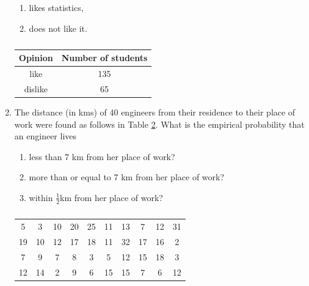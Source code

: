 \begin{enumerate}[label=\arabic*.,ref=\thesubsection.\theenumi]
\begin{enumerate}
\item likes statistics,
\item  does not like it.
\end{enumerate}
\begin{table}[!ht]
\centering
\begin{tabular}{ |c|c| } 
 \hline
 \textbf{Opinion} &\textbf{Number of students}\\
 \hline
 like  &135\\ 
 \hline
 dislike  &65\\ 
 \hline
\end{tabular}
\caption{}
\label{table:1.2.6}
\end{table}
\solution


\item The distance (in kms) of 40 engineers from their residence to their place of work were found as follows in Table \ref{table:1.2.7}.
What is the empirical probability that an engineer lives
\begin{enumerate}
\item less than 7 km from her place of work?
\item more than or equal to 7 km from her place of work? 
\item within $\frac{1}{2}$km from her place of work?
\end{enumerate}

\begin{table}[!ht]
\centering
\begin{tabular}{ cccccccccc} 

 5 &3 &10 &20 &25 &11 &13 &7 &12 &31\\
 19 &10 &12 &17 &18 &11 &32 &17 &16 &2\\
 7 &9 &7 &8 &3 &5 &12 &15 &18 &3 \\
 12 &14 &2 &9 &6 &15 &15 &7 &6 &12\\ 
 \end{tabular}\\
\caption{}
\label{table:1.2.7}
\end{table}
\solution




\end{enumerate}
